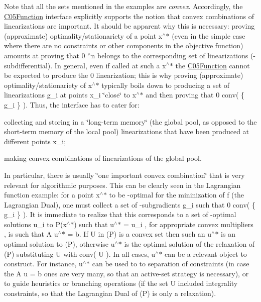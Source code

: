 Note that all the sets mentioned in the examples are {\itshape convex}. Accordingly, the \mbox{\hyperlink{class_s_m_spp__di__unipi__it_1_1_c05_function}{C05\+Function}} interface explicitly supports the notion that convex combinations of linearizations are important. It should be apparent why this is necessary\+: proving (approximate) optimality/stationariety of a point x$^\wedge$$\ast$ (even in the simple case where there are no constraints or other components in the objective function) amounts at proving that 0  $^\wedge$n belongs to the corresponding set of linearizations (-\/subdifferential). In general, even if called at such a x$^\wedge$$\ast$ the \mbox{\hyperlink{class_s_m_spp__di__unipi__it_1_1_c05_function}{C05\+Function}} cannot be expected to produce the 0 linearization; this is why proving (approximate) optimality/stationariety of x$^\wedge$$\ast$ typically boils down to producing a set of linearizations g\+\_\+i at points x\+\_\+i \char`\"{}close\char`\"{} to x$^\wedge$$\ast$ and then proving that 0  conv( \{ g\+\_\+i \} ). Thus, the interface has to cater for\+:


\begin{DoxyItemize}
\item collecting and storing in a \char`\"{}long-\/term memory\char`\"{} (the global pool, as opposed to the short-\/term memory of the local pool) linearizations that have been produced at different points x\+\_\+i;
\item making convex combinations of linearizations of the global pool.
\end{DoxyItemize}

In particular, there is usually \char`\"{}one important convex combination\char`\"{} that is very relevant for algorithmic purposes. This can be clearly seen in the Lagrangian function example\+: for a point x$^\wedge$$\ast$ to be -\/optimal for the mininization of f (the Lagrangian Dual), one must collect a set of -\/subgradients g\+\_\+i such that 0  conv( \{ g\+\_\+i \} ). It is immediate to realize that this corresponds to a set of -\/optimal solutions u\+\_\+i to P(x$^\wedge$$\ast$) such that u$^\wedge$$\ast$ =  u\+\_\+i , for appropriate convex multipliers , is such that A u$^\wedge$$\ast$ = b. If U in (P) is a convex set then such an u$^\wedge$$\ast$ is an optimal solution to (P), otherwise u$^\wedge$$\ast$ is the optimal solution of the relaxation of (P) substituting U with conv( U ). In all cases, u$^\wedge$$\ast$ can be a relevant object to construct. For instance, u$^\wedge$$\ast$ can be used to to separation of constraints (in case the A u = b ones are very many, so that an active-\/set strategy is necessary), or to guide heuristics or branching operations (if the set U included integrality constraints, so that the Lagrangian Dual of (P) is only a relaxation).

